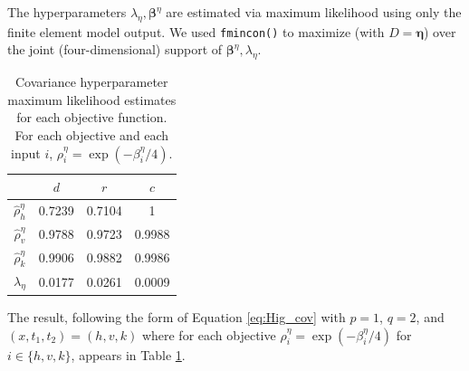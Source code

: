 \documentclass[twocolumn,10pt]{asme2ej}
\begin{document}
%
The hyperparameters $\lambda_\eta,\boldsymbol \beta^\eta$ are estimated %
% 
via maximum likelihood using only the finite element model output.
% 
%
We used \texttt{fmincon()} \cite{MATLAB2017} %
to maximize (with $D=\boldsymbol\eta$) over the joint (four-dimensional) support of $\boldsymbol \beta^\eta,\lambda_\eta$.  
%
\begin{table}[h]
	\renewcommand{\arraystretch}{1.2}
	\begin{center}
		\begin{tabular}{|c|c|c|c|}
			\hline 
			& $d$ & $r$ & $c$ \\ 
			\hline 
			$\hat\rho^\eta_h$	&0.7239 & 0.7104  & 1 \\ 
			\hline 
			$\hat\rho^\eta_v$	&0.9788&  0.9723  & 0.9988 \\ 
			\hline 
			$\hat\rho^\eta_k$	& 0.9906 &0.9882  & 0.9986 \\ 
			\hline 
			$\lambda_\eta$	& 0.0177  & 0.0261 & 0.0009 \\ 
			\hline 
		\end{tabular} 
	\end{center}
	\caption{Covariance hyperparameter maximum likelihood estimates for each objective function. For each objective and each input $i$, $\rho_i^\eta = \exp(-\beta^\eta_i/4)$.}
	\label{table:mles}
\end{table}
%
The result, following the form of Equation \eqref{eq:Hig_cov} with $p=1$, $q=2$, and $(x,t_1,t_2)=(h,v,k)$ where for each objective $\rho^\eta_i = \exp(-\beta_i^\eta/4)$ for $i\in\{h,v,k\}$, appears in Table \ref{table:mles}.
%
\end{document}
